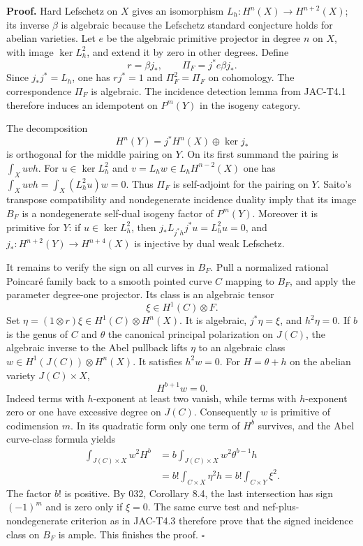 \documentclass[11pt,a4paper]{article}
\begin{document}
\textbf{Proof.}
Hard Lefschetz on $X$ gives an isomorphism
$L_h:H^n(X)\to H^{n+2}(X)$; its inverse $\beta$ is algebraic because
the Lefschetz standard conjecture holds for abelian varieties. Let $e$
be the algebraic primitive projector in degree $n$ on $X$, with image
$\ker L_h^2$, and extend it by zero in other degrees. Define
\[
 r=\beta j_*,\qquad \Pi_F=j^*e\beta j_*.
\]
Since $j_*j^*=L_h$, one has $rj^*=1$ and $\Pi_F^2=\Pi_F$ on
cohomology. The correspondence $\Pi_F$ is algebraic. The incidence
detection lemma from JAC-T4.1 therefore induces an idempotent on
$P^m(Y)$ in the isogeny category.

The decomposition
\[
 H^n(Y)=j^*H^n(X)\oplus\ker j_*
\]
is orthogonal for the middle pairing on $Y$. On its first summand the
pairing is $\int_X uvh$. For $u\in\ker L_h^2$ and
$v=L_hw\in L_hH^{n-2}(X)$ one has
$\int_Xuvh=\int_X(L_h^2u)w=0$. Thus $\Pi_F$ is self-adjoint for
the pairing on $Y$. Saito's transpose compatibility and nondegenerate
incidence duality imply that its image $B_F$ is a nondegenerate
self-dual isogeny factor of $P^m(Y)$. Moreover it is primitive for $Y$:
if $u\in\ker L_h^2$, then
$j_*L_{j^*h}j^*u=L_h^2u=0$, and
$j_*:H^{n+2}(Y)\to H^{n+4}(X)$ is injective by dual weak Lefschetz.

It remains to verify the sign on all curves in $B_F$. Pull a normalized
rational Poincar\'e family back to a smooth pointed curve $C$ mapping to
$B_F$, and apply the parameter degree-one projector. Its class is an
algebraic tensor
\[
 \xi\in H^1(C)\otimes F.
\]
Set $\eta=(1\otimes r)\xi\in H^1(C)\otimes H^n(X)$.
It is algebraic, $j^*\eta=\xi$, and $h^2\eta=0$.
If $b$ is the genus of $C$ and $\theta$ the canonical principal
polarization on $J(C)$, the algebraic inverse to the Abel pullback
lifts $\eta$ to an algebraic class
$w\in H^1(J(C))\otimes H^n(X)$. It satisfies $h^2w=0$.
For $H=\theta+h$ on the abelian variety $J(C)\times X$,
\[
 H^{b+1}w=0.
\]
Indeed terms with $h$-exponent at least two vanish, while terms with
$h$-exponent zero or one have excessive degree on $J(C)$.
Consequently $w$ is primitive of codimension $m$. In its quadratic form
only one term of $H^b$ survives, and the Abel curve-class formula yields
\[
 \begin{aligned}
 \int_{J(C)\times X}w^2H^b
 &=b\int_{J(C)\times X}w^2\theta^{b-1}h\\
 &=b!\int_{C\times X}\eta^2h
 =b!\int_{C\times Y}\xi^2.
 \end{aligned}                                                \tag{H9.9}
\]
The factor $b!$ is positive. By 032, Corollary 8.4, the last intersection
has sign $(-1)^m$ and is zero only if $\xi=0$. The same curve test and
nef-plus-nondegenerate criterion as in JAC-T4.3 therefore prove that
the signed incidence class on $B_F$ is ample. This finishes the proof.
\hfill$\square$
\end{document}
